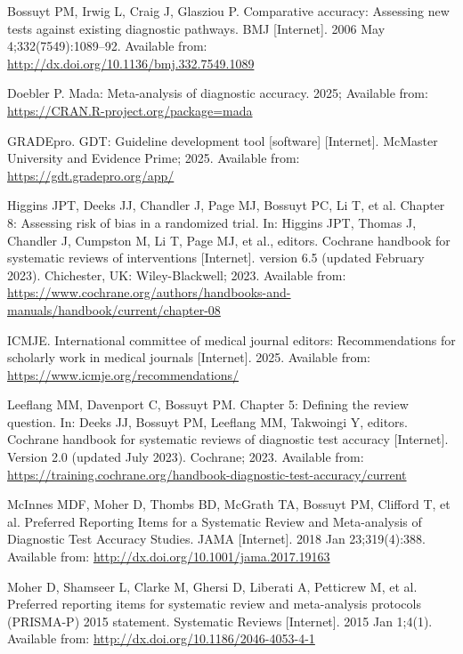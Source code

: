 \documentclass[
  11pt,
  a4paper,
  DIV=11,
  numbers=noendperiod]{scrreprt}
\newlength{\cslhangindent}
\newenvironment{CSLReferences}[2] %
 {\begin{list}{}{%
  \setlength{\itemindent}{0pt}
  \setlength{\leftmargin}{0pt}
  \setlength{\parsep}{0pt}
  \ifodd #1
   \setlength{\leftmargin}{\cslhangindent}
   \setlength{\itemindent}{-1\cslhangindent}
  \fi
  \setlength{\itemsep}{#2\baselineskip}}}
 {\end{list}}
\begin{document}
\label{refs}
\begin{CSLReferences}{1}{1}
Bossuyt PM, Irwig L, Craig J, Glasziou P. Comparative accuracy:
Assessing new tests against existing diagnostic pathways. BMJ
{[}Internet{]}. 2006 May 4;332(7549):1089--92. Available from:
\url{http://dx.doi.org/10.1136/bmj.332.7549.1089}

Doebler P. Mada: Meta-analysis of diagnostic accuracy. 2025; Available
from: \url{https://CRAN.R-project.org/package=mada}

GRADEpro. GDT: Guideline development tool {[}software{]} {[}Internet{]}.
{McMaster University and Evidence Prime}; 2025. Available from:
\url{https://gdt.gradepro.org/app/}

Higgins JPT, Deeks JJ, Chandler J, Page MJ, Bossuyt PC, Li T, et al.
Chapter 8: Assessing risk of bias in a randomized trial. In: Higgins
JPT, Thomas J, Chandler J, Cumpston M, Li T, Page MJ, et al., editors.
Cochrane handbook for systematic reviews of interventions
{[}Internet{]}. version 6.5 (updated February 2023). Chichester, UK:
Wiley-Blackwell; 2023. Available from:
\url{https://www.cochrane.org/authors/handbooks-and-manuals/handbook/current/chapter-08}

ICMJE. International committee of medical journal editors:
Recommendations for scholarly work in medical journals {[}Internet{]}.
2025. Available from: \url{https://www.icmje.org/recommendations/}

Leeflang MM, Davenport C, Bossuyt PM. Chapter 5: Defining the review
question. In: Deeks JJ, Bossuyt PM, Leeflang MM, Takwoingi Y, editors.
Cochrane handbook for systematic reviews of diagnostic test accuracy
{[}Internet{]}. Version 2.0 (updated July 2023). Cochrane; 2023.
Available from:
\url{https://training.cochrane.org/handbook-diagnostic-test-accuracy/current}

McInnes MDF, Moher D, Thombs BD, McGrath TA, Bossuyt PM, Clifford T, et
al. Preferred Reporting Items for a Systematic Review and Meta-analysis
of Diagnostic Test Accuracy Studies. JAMA {[}Internet{]}. 2018 Jan
23;319(4):388. Available from:
\url{http://dx.doi.org/10.1001/jama.2017.19163}

Moher D, Shamseer L, Clarke M, Ghersi D, Liberati A, Petticrew M, et al.
Preferred reporting items for systematic review and meta-analysis
protocols (PRISMA-P) 2015 statement. Systematic Reviews {[}Internet{]}.
2015 Jan 1;4(1). Available from:
\url{http://dx.doi.org/10.1186/2046-4053-4-1}


\end{CSLReferences}
\end{document}
